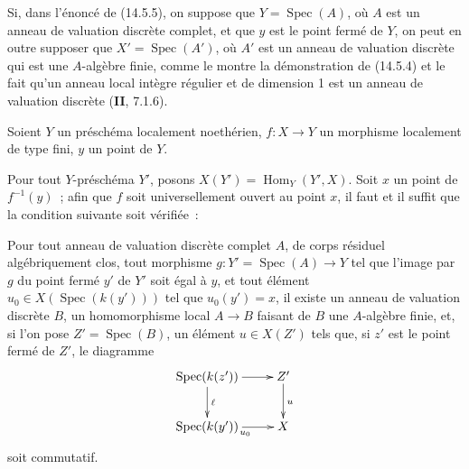 \begin{remark}[14.5.7]
\label{IV.14.5.7-fr}
Si, dans l'énoncé de (14.5.5), on suppose que $Y=\operatorname{Spec}(A)$, où $A$ est un anneau
de valuation discrète complet, et que $y$ est le point fermé de $Y$, on peut en
outre supposer que $X'=\operatorname{Spec}(A')$, où $A'$ est un anneau de valuation discrète qui
est une $A$-algèbre finie, comme le montre la démonstration de (14.5.4) et le fait
qu'un anneau local intègre régulier et de dimension 1 est un anneau de valuation
discrète (\textbf{II}, 7.1.6).
\end{remark}

\begin{proposition}[14.5.8]
\label{IV.14.5.8-fr}
Soient $Y$ un préschéma localement noethérien, $f:X\to Y$ un morphisme localement
de type fini, $y$ un point de $Y$.

Pour tout $Y$-préschéma $Y'$, posons $X(Y')=\operatorname{Hom}_Y(Y',X)$. Soit $x$ un point de
$f^{-1}(y)$~; afin que $f$ soit universellement ouvert au point $x$, il faut et il
suffit que la condition suivante soit vérifiée~:

Pour tout anneau de valuation discrète complet $A$, de corps résiduel
algébriquement clos, tout morphisme $g:Y'=\operatorname{Spec}(A)\to Y$ tel que l'image par $g$ du
point fermé $y'$ de $Y'$ soit égal à $y$, et tout élément
$u_0\in X(\operatorname{Spec}(k(y')))$ tel que $u_0(y')=x$, il existe un anneau de valuation
discrète $B$, un homomorphisme local $A\to B$ faisant de $B$ une $A$-algèbre finie,
et, si l'on pose $Z'=\operatorname{Spec}(B)$, un élément $u\in X(Z')$ tels que, si $z'$ est le
point fermé de $Z'$, le diagramme
\[
  \xymatrix{
    \operatorname{Spec}(k(z')) \ar[r] \ar[d]^{\ell} & Z' \ar[d]^{u} \\
    \operatorname{Spec}(k(y')) \ar[r]_{u_0} & X
  }
\]
soit commutatif.
\end{proposition}


